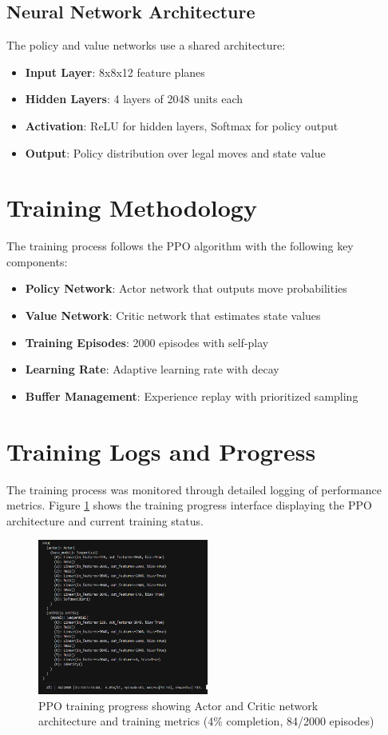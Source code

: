 \documentclass[11pt,a4paper]{report}
\begin{document}
\subsection{Neural Network Architecture}
The policy and value networks use a shared architecture:

\begin{itemize}
    \item \textbf{Input Layer}: 8x8x12 feature planes
    \item \textbf{Hidden Layers}: 4 layers of 2048 units each
    \item \textbf{Activation}: ReLU for hidden layers, Softmax for policy output
    \item \textbf{Output}: Policy distribution over legal moves and state value
\end{itemize}

\section{Training Methodology}
The training process follows the PPO algorithm with the following key components:

\begin{itemize}
    \item \textbf{Policy Network}: Actor network that outputs move probabilities
    \item \textbf{Value Network}: Critic network that estimates state values
    \item \textbf{Training Episodes}: 2000 episodes with self-play
    \item \textbf{Learning Rate}: Adaptive learning rate with decay
    \item \textbf{Buffer Management}: Experience replay with prioritized sampling
\end{itemize}

\section{Training Logs and Progress}
The training process was monitored through detailed logging of performance metrics. Figure \ref{fig:rl_training} shows the training progress interface displaying the PPO architecture and current training status.

\begin{figure}[H]
    \centering
    \includegraphics[width=0.5\textwidth]{images/reinforcement_learning_training.png}
    \caption{PPO training progress showing Actor and Critic network architecture and training metrics (4\% completion, 84/2000 episodes)}
    \label{fig:rl_training}
\end{figure}
\end{document}
